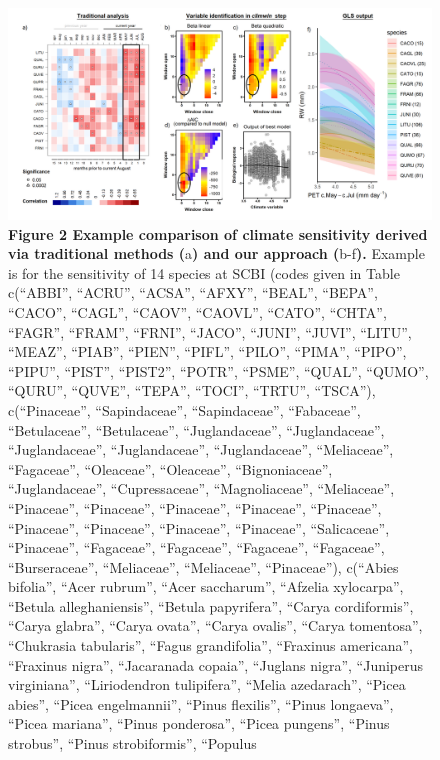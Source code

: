 \documentclass[
]{article}
\begin{document}
\begin{figure}
\centering
\includegraphics{tables_figures/quilt_comparison.png}
\caption{\textbf{Figure 2 \textbar{} Example comparison of climate
sensitivity derived via traditional methods (}a\textbf{) and our
approach (}b-f\textbf{).} Example is for the sensitivity of 14 species
at SCBI (codes given in Table c(``ABBI'', ``ACRU'', ``ACSA'', ``AFXY'',
``BEAL'', ``BEPA'', ``CACO'', ``CAGL'', ``CAOV'', ``CAOVL'', ``CATO'',
``CHTA'', ``FAGR'', ``FRAM'', ``FRNI'', ``JACO'', ``JUNI'', ``JUVI'',
``LITU'', ``MEAZ'', ``PIAB'', ``PIEN'', ``PIFL'', ``PILO'', ``PIMA'',
``PIPO'', ``PIPU'', ``PIST'', ``PIST2'', ``POTR'', ``PSME'', ``QUAL'',
``QUMO'', ``QURU'', ``QUVE'', ``TEPA'', ``TOCI'', ``TRTU'', ``TSCA''),
c(``Pinaceae'', ``Sapindaceae'', ``Sapindaceae'', ``Fabaceae'',
``Betulaceae'', ``Betulaceae'', ``Juglandaceae'', ``Juglandaceae'',
``Juglandaceae'', ``Juglandaceae'', ``Juglandaceae'', ``Meliaceae'',
``Fagaceae'', ``Oleaceae'', ``Oleaceae'', ``Bignoniaceae'',
``Juglandaceae'', ``Cupressaceae'', ``Magnoliaceae'', ``Meliaceae'',
``Pinaceae'', ``Pinaceae'', ``Pinaceae'', ``Pinaceae'', ``Pinaceae'',
``Pinaceae'', ``Pinaceae'', ``Pinaceae'', ``Pinaceae'', ``Salicaceae'',
``Pinaceae'', ``Fagaceae'', ``Fagaceae'', ``Fagaceae'', ``Fagaceae'',
``Burseraceae'', ``Meliaceae'', ``Meliaceae'', ``Pinaceae''), c(``Abies
bifolia'', ``Acer rubrum'', ``Acer saccharum'', ``Afzelia xylocarpa'',
``Betula alleghaniensis'', ``Betula papyrifera'', ``Carya cordiformis'',
``Carya glabra'', ``Carya ovata'', ``Carya ovalis'', ``Carya
tomentosa'', ``Chukrasia tabularis'', ``Fagus grandifolia'', ``Fraxinus
americana'', ``Fraxinus nigra'', ``Jacaranada copaia'', ``Juglans
nigra'', ``Juniperus virginiana'', ``Liriodendron tulipifera'', ``Melia
azedarach'', ``Picea abies'', ``Picea engelmannii'', ``Pinus flexilis'',
``Pinus longaeva'', ``Picea mariana'', ``Pinus ponderosa'', ``Picea
pungens'', ``Pinus strobus'', ``Pinus strobiformis'', ``Populus
}
\end{figure}
\end{document}
